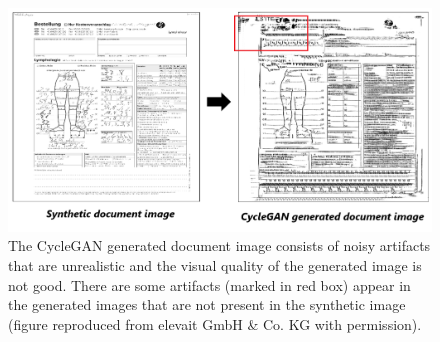 \begin{figure}[H]
        \begin{center}
	    \includegraphics[scale=0.50]{images/Evaluation/failure4.png}
	    \caption[There are some artifacts appear in the generated image that are not present in the synthetic image.]{The \ac{CycleGAN} generated document image consists of noisy artifacts that are unrealistic and the visual quality of the generated image is not good. There are some artifacts (marked in red box) appear in the generated images that are not present in the synthetic image (figure reproduced from elevait GmbH \& Co. KG with permission).}
	    \label{fig:failure4}
	    \end{center}
\end{figure}





































